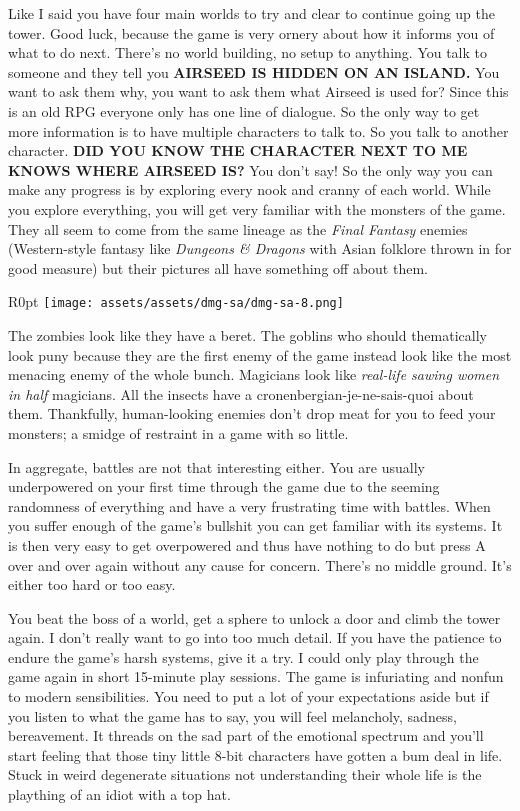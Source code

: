 \documentclass{book}
\begin{document}
Like I said you have four main worlds to try and clear to continue going up the tower. Good luck, because the game is very ornery about how it informs you of what to do next. There’s no world building, no setup to anything. You talk to someone and they tell you \textbf{AIRSEED IS HIDDEN ON AN ISLAND.} You want to ask them why, you want to ask them what Airseed is used for? Since this is an old RPG everyone only has one line of dialogue. So the only way to get more information is to have multiple characters to talk to. So you talk to another character. \textbf{DID YOU KNOW THE CHARACTER NEXT TO ME KNOWS WHERE AIRSEED IS?} You don’t say! So the only way you can make any progress is by exploring every nook and cranny of each world. While you explore everything, you will get very familiar with the monsters of the game. They all seem to come from the same lineage as the \emph{Final Fantasy} enemies (Western-style fantasy like \emph{Dungeons \& Dragons} with Asian folklore thrown in for good measure) but their pictures all have something off about them.

\begin{wrapfigure}{R}{0pt} \texttt{[image: assets/assets/dmg-sa/dmg-sa-8.png]}\end{wrapfigure}
The zombies look like they have a beret. The goblins who should thematically look puny because they are the first enemy of the game instead look like the most menacing enemy of the whole bunch. Magicians look like \emph{real-life sawing women in half} magicians. All the insects have a cronenbergian-je-ne-sais-quoi about them. Thankfully, human-looking enemies don’t drop meat for you to feed your monsters; a smidge of restraint in a game with so little.

In aggregate, battles are not that interesting either. You are usually underpowered on your first time through the game due to the seeming randomness of everything and have a very frustrating time with battles. When you suffer enough of the game’s bullshit you can get familiar with its systems. It is then very easy to get overpowered and thus have nothing to do but press A over and over again without any cause for concern. There’s no middle ground. It’s either too hard or too easy.

You beat the boss of a world, get a sphere to unlock a door and climb the tower again. I don’t really want to go into too much detail. If you have the patience to endure the game’s harsh systems, give it a try. I could only play through the game again in short 15-minute play sessions. The game is infuriating and nonfun to modern sensibilities. You need to put a lot of your expectations aside but if you listen to what the game has to say, you will feel melancholy, sadness, bereavement. It threads on the sad part of the emotional spectrum and you’ll start feeling that those tiny little 8-bit characters have gotten a bum deal in life. Stuck in weird degenerate situations not understanding their whole life is the plaything of an idiot with a top hat.
\end{document}
